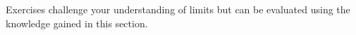 {\noindent Exercises}
{ challenge your understanding of limits but can be evaluated using the knowledge gained in this section.}
